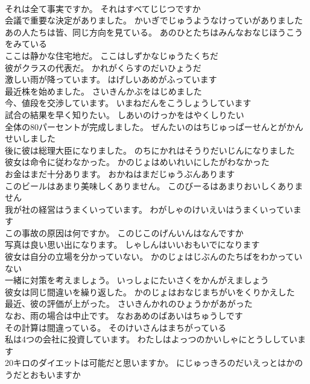 \documentclass[8pt]{extreport}
\begin{document}
\begin{CJK}{UTF8}{min}
\\	それは全て事実ですか。	それはすべてじじつですか 
\\	会議で重要な決定がありました。	かいぎでじゅうようなけっていがありました 
\\	あの人たちは皆、同じ方向を見ている。	あのひとたちはみんなおなじほうこうをみている 
\\	ここは静かな住宅地だ。	ここはしずかなじゅうたくちだ 
\\	彼がクラスの代表だ。	かれがくらすのだいひょうだ 
\\	激しい雨が降っています。	はげしいあめがふっています 
\\	最近株を始めました。	さいきんかぶをはじめました 
\\	今、値段を交渉しています。	いまねだんをこうしょうしています 
\\	試合の結果を早く知りたい。	しあいのけっかをはやくしりたい 
\\	全体の80パーセントが完成しました。	ぜんたいのはちじゅっぱーせんとがかんせいしました 
\\	後に彼は総理大臣になりました。	のちにかれはそうりだいじんになりました 
\\	彼女は命令に従わなかった。	かのじょはめいれいにしたがわなかった 
\\	お金はまだ十分あります。	おかねはまだじゅうぶんあります 
\\	このビールはあまり美味しくありません。	このびーるはあまりおいしくありません 
\\	我が社の経営はうまくいっています。	わがしゃのけいえいはうまくいっています 
\\	この事故の原因は何ですか。	このじこのげんいんはなんですか 
\\	写真は良い思い出になります。	しゃしんはいいおもいでになります 
\\	彼女は自分の立場を分かっていない。	かのじょはじぶんのたちばをわかっていない 
\\	一緒に対策を考えましょう。	いっしょにたいさくをかんがえましょう 
\\	彼女は同じ間違いを繰り返した。	かのじょはおなじまちがいをくりかえした 
\\	最近、彼の評価が上がった。	さいきんかれのひょうかがあがった 
\\	なお、雨の場合は中止です。	なおあめのばあいはちゅうしです 
\\	その計算は間違っている。	そのけいさんはまちがっている 
\\	私は4つの会社に投資しています。	わたしはよっつのかいしゃにとうししています 
\\	20キロのダイエットは可能だと思いますか。	にじゅっきろのだいえっとはかのうだとおもいますか 

\end{CJK}
\end{document}
